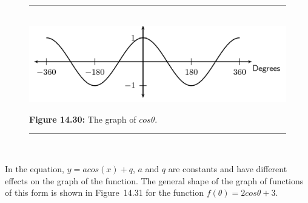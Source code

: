 \begin{figure}[H] %
\begin{center}
\rule[.1in]{\figurerulewidth}{.005in} \\
\label{m39414*uid50!!!underscore!!!media}\label{m39414*uid50!!!underscore!!!printimage}\includegraphics{col11306.imgs/m39414_MG10C15_024.png} %
\vspace{2pt}
\vspace{\rubberspace}\par \begin{cnxcaption}
\small \textbf{Figure 14.30: }The graph of $cos\theta $.
\end{cnxcaption}
\vspace{.1in}
\rule[.1in]{\figurerulewidth}{.005in} \\
\end{center}
\end{figure}       
\label{m39414*uid51}
\nopagebreak
\label{m39414*id87386}In the equation, $y=acos\left(x\right)+q$, $a$ and $q$ are constants and have different effects on the graph of the function. The general shape of the graph of functions of this form is shown in Figure~14.31 for the function $f\left(\theta \right)=2cos\theta +3$.\par 
\setcounter{subfigure}{0}
